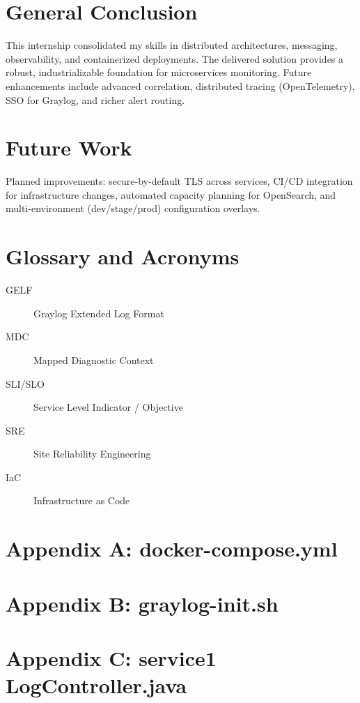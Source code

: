 \documentclass[12pt,a4paper]{report}
\begin{document}
\chapter*{General Conclusion}
This internship consolidated my skills in distributed architectures, messaging, observability, and containerized deployments. The delivered solution provides a robust, industrializable foundation for microservices monitoring. Future enhancements include advanced correlation, distributed tracing (OpenTelemetry), SSO for Graylog, and richer alert routing.

\chapter*{Future Work}
Planned improvements: secure-by-default TLS across services, CI/CD integration for infrastructure changes, automated capacity planning for OpenSearch, and multi-environment (dev/stage/prod) configuration overlays.

\chapter*{Glossary and Acronyms}
\begin{description}
  \item[GELF] Graylog Extended Log Format
  \item[MDC] Mapped Diagnostic Context
  \item[SLI/SLO] Service Level Indicator / Objective
  \item[SRE] Site Reliability Engineering
  \item[IaC] Infrastructure as Code
\end{description}

\appendix
\chapter{Appendix A: docker-compose.yml}


\chapter{Appendix B: graylog-init.sh}


\chapter{Appendix C: service1 LogController.java}

\end{document}
